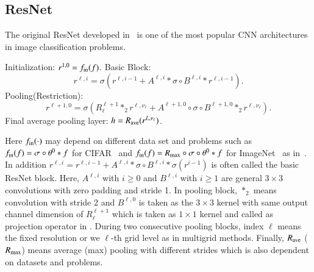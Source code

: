 \subsection{ResNet}
The original ResNet developed in~\cite{he2016deep} is one
of the most popular CNN architectures in image classification problems.
\begin{breakablealgorithm}
	\footnotesize
	\caption{$ h = \text{ResNet}(f; J,\nu_1, \cdots, \nu_J)$}
	\label{alg:resnet}
	\begin{algorithmic}[1]
		\State Initialization:  $r^{1,0} = f_{\rm in}(f)$.
		\State Basic Block:
		\begin{equation}\label{ori-ResNet}
			r^{\ell,i} = \sigma\left(r^{\ell, i-1} + A^{\ell,i} \ast  \sigma \circ B^{\ell,i}\ast r^{\ell,i-1}\right).
		\end{equation}
		\EndFor
		\State Pooling(Restriction):
		\begin{equation}
			\label{ori-ResNet0}
			r^{\ell+1,0} = \sigma \left( R_\ell^{\ell+1} \ast_2  r^{\ell, \nu_\ell} + A^{\ell+1,0} \circ \sigma \circ B^{\ell+1,0} \ast_2 r^{\ell, \nu_\ell} \right).
		\end{equation}
		\EndFor
		\State Final average pooling layer:
		$h =  R_{\rm ave}( r^{L,\nu_\ell})$.
	\end{algorithmic}
\end{breakablealgorithm}
Here $f_{\rm in}(\cdot)$ may depend on different data set and problems 
such as $f_{\rm in}(f) = \sigma \circ \theta^0 \ast f $ for CIFAR~\cite{krizhevsky2009learning} and
$f_{\rm in}(f) = R_{\rm max}\circ \sigma \circ \theta^0 \ast  f$ for ImageNet~\cite{deng2009imagenet} as in~\cite{he2016identity}.
In addition $r^{\ell,i} =   r^{\ell, i-1} +  A^{\ell,i} \ast  \sigma \circ B^{\ell,i} \ast \sigma (r^{i-1})$ is often called the basic ResNet block.
Here, $A^{\ell,i}$ with $i\ge0$ and $B^{\ell,i}$ with $i\ge1$ are general $3\times3$ convolutions with zero padding and stride 1.
In pooling block, $\ast _2$ means convolution with stride 2 and $B^{\ell,0}$ is taken as the $3\times3$ kernel with same output channel dimension of $R_\ell^{\ell+1}$
which is taken as $1\times1$ kernel and called as projection operator in \cite{he2016identity}. 
During two consecutive pooling blocks, index $\ell$ means the fixed resolution or we $\ell$-th grid level as in multigrid methods.
Finally, $R_{\rm ave}$ ($R_{\rm max}$) means average (max) pooling with different strides which is also dependent on datasets and problems.



